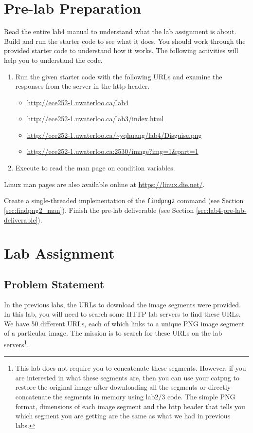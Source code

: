 \section{Pre-lab Preparation}
Read the entire lab4 manual to understand what the lab assignment is about. Build and run the starter code to see what it does. You should work through the provided starter code to understand how it works. The following activities will help you to understand the code.
\begin{enumerate}
\item Run the given starter code with the following URLs and examine the responses from the server in the http header. 
  \begin{itemize}
  \item \url{http://ece252-1.uwaterloo.ca/lab4}
  \item \url{http://ece252-1.uwaterloo.ca/lab3/index.html}
  \item \url{http://ece252-1.uwaterloo.ca/~yqhuang/lab4/Disguise.png}
  \item \url{http://ece252-1.uwaterloo.ca:2530/image?img=1&part=1}
  \end{itemize}
\item Execute  to read the man page on condition variables.
\end{enumerate}
Linux man pages are also available online at \url{https://linux.die.net/}.

Create a single-threaded implementation of the \verb+findpng2+ command (see Section \ref{sec:findpng2_man}). Finish the pre-lab deliverable (see Section \ref{sec:lab4-pre-lab-deliverable}).

\section{Lab Assignment}
\subsection{Problem Statement}
In the previous labs, the URLs to download the image segments were provided. In this lab, you will need to search some HTTP lab servers to find these URLs. We have 50 different URLs, each of which links to a unique PNG image segment of a particular image. The mission is to search for these URLs on the lab servers\footnote{This lab does not require you to concatenate these segments. However, if you are interested in what these segments are, then you can use your catpng to restore the original image after downloading all the segments or directly concatenate the segments in memory using lab2/3 code. The simple PNG format, dimensions of each image segment and the http header that tells you which segment you are getting are the same as what we had in previous labs.}.

